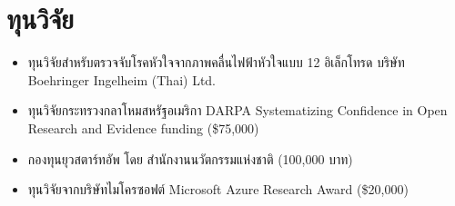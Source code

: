 \section{\sc ทุนวิจัย}

\begin{itemize}[leftmargin=0cm, label={}]
\itemsep0em

\item ทุนวิจัยสำหรับตรวจจับโรคหัวใจจากภาพคลื่นไฟฟ้าหัวใจแบบ 12 อิเล็กโทรด บริษัท Boehringer Ingelheim (Thai) Ltd.

\item ทุนวิจัยกระทรวงกลาโหมสหรัฐอเมริกา DARPA Systematizing Confidence in Open Research and Evidence funding (\$75,000)

\item กองทุนยุวสตาร์ทอัพ โดย สำนักงานนวัตกรรมแห่งชาติ (100,000 บาท)

\item ทุนวิจัยจากบริษัทไมโครซอฟต์ Microsoft Azure Research Award (\$20,000)

\end{itemize}
